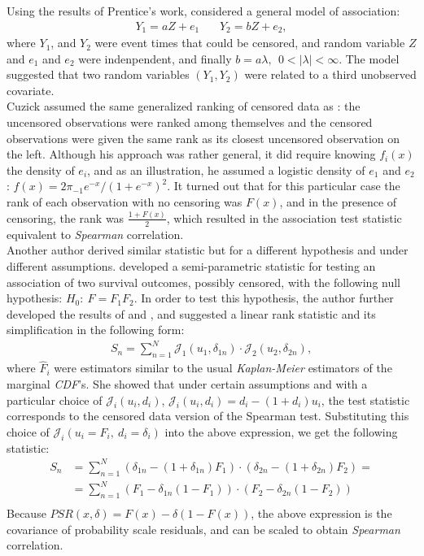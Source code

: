 \documentclass[]{article}
\begin{document}
Using the results of Prentice's work, \cite{cuzick1982rank} considered a general model of association:
	$$
	\begin{aligned}
		Y_1 = aZ + e_1 ~~~~~~~~ Y_2 = bZ + e_2,
	\end{aligned}
	$$
where $Y_1$, and $Y_2$ were event times that could be censored, and random variable $Z$ and $e_1$ and $e_2$ were indenpendent, and finally $b=a\lambda,~~0<|\lambda|<\infty$. The model suggested that two random variables $(Y_1, Y_2)$ were related to a third unobserved covariate.\\
Cuzick assumed the same generalized ranking of censored data as \cite{prentice1978linear}: the uncensored observations were ranked among themselves and the censored observations were given the same rank as its closest uncensored observation on the left. Although his approach was rather general, it did require knowing $f_i(x)$ the density of $e_i$, and as an illustration, he assumed a logistic density of $e_1$ and $e_2$:  $f(x) = 2\pi_{-1} e^{-x}/(1+e^{-x})^2$. It turned out that for this particular case the rank of each observation with no censoring was $F(x)$, and in the presence of censoring, the rank was $\frac{1+F(x)}{2}$, which resulted in the association test statistic equivalent to \emph{Spearman} correlation.\\

Another author derived similar statistic but for a different hypothesis and under different assumptions. \cite{dabrowska1986rank} developed a semi-parametric statistic for testing an association of two survival outcomes, possibly censored, with the following null hypothesis: $H_0:~F=F_1 F_2$. In order to test this hypothesis, the author further developed the results of \cite{prentice1978linear} and \cite{cuzick1982rank} , and suggested a linear rank statistic and its simplification in the following form:
	$$
	\begin{aligned}
		 S_n = \sum_{n=1}^N \mathcal{J}_1( u_1, \delta_{1n}) \cdot \mathcal{J}_2( u_2, \delta_{2n}),
	\end{aligned}
	$$
where $\hat{F}_i$ were estimators similar to the usual \emph{Kaplan-Meier} estimators of the marginal \emph{CDF}'s. She showed that under certain assumptions and with a particular choice of $\mathcal{J}_i(u_i,d_i)$, $\mathcal{J}_i(u_i,d_i) =d_i-(1+d_i)u_i$, the test statistic corresponds to the censored data version of the Spearman test. Substituting this choice of $\mathcal{J}_i(u_i=F_i,~d_i=\delta_i)$ into the above expression, we get the following statistic:
	$$
	\begin{aligned}
		 S_n & = \sum_{n=1}^N (\delta_{1n} - (1+\delta_{1n})F_1)\cdot (\delta_{2n} - (1+\delta_{2n})F_2)=\\ 
		 &=\sum_{n=1}^N (F_1 - \delta_{1n}(1-F_1))\cdot (F_2 - \delta_{2n}(1-F_2))\\
	\end{aligned}
	$$
Because $PSR(x, \delta) = F(x)-\delta(1-F(x))$, the above expression is the covariance of probability scale residuals, and can be scaled to obtain \emph{Spearman} correlation.\\
\end{document}
